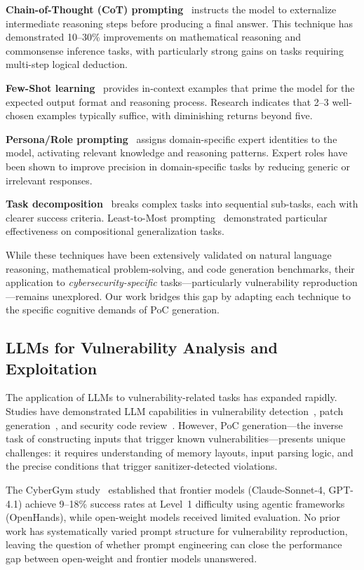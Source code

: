 \documentclass{ieeeaccess}
\begin{document}
\textbf{Chain-of-Thought (CoT) prompting}~\cite{wei2022cot} instructs the model to externalize intermediate reasoning steps before producing a final answer. This technique has demonstrated 10--30\% improvements on mathematical reasoning and commonsense inference tasks, with particularly strong gains on tasks requiring multi-step logical deduction.

\textbf{Few-Shot learning}~\cite{brown2020fewshot} provides in-context examples that prime the model for the expected output format and reasoning process. Research indicates that 2--3 well-chosen examples typically suffice, with diminishing returns beyond five.

\textbf{Persona/Role prompting}~\cite{zheng2023persona} assigns domain-specific expert identities to the model, activating relevant knowledge and reasoning patterns. Expert roles have been shown to improve precision in domain-specific tasks by reducing generic or irrelevant responses.

\textbf{Task decomposition}~\cite{zhou2023leasttomost} breaks complex tasks into sequential sub-tasks, each with clearer success criteria. Least-to-Most prompting~\cite{zhou2023leasttomost} demonstrated particular effectiveness on compositional generalization tasks.

While these techniques have been extensively validated on natural language reasoning, mathematical problem-solving, and code generation benchmarks, their application to \emph{cybersecurity-specific} tasks---particularly vulnerability reproduction---remains unexplored. Our work bridges this gap by adapting each technique to the specific cognitive demands of PoC generation.

\subsection{LLMs for Vulnerability Analysis and Exploitation}

The application of LLMs to vulnerability-related tasks has expanded rapidly. Studies have demonstrated LLM capabilities in vulnerability detection~\cite{li2024vulndetection}, patch generation~\cite{patch_generation}, and security code review~\cite{code_review}. However, PoC generation---the inverse task of constructing inputs that trigger known vulnerabilities---presents unique challenges: it requires understanding of memory layouts, input parsing logic, and the precise conditions that trigger sanitizer-detected violations.

The CyberGym study~\cite{cybergym} established that frontier models (Claude-Sonnet-4, GPT-4.1) achieve 9--18\% success rates at Level~1 difficulty using agentic frameworks (OpenHands), while open-weight models received limited evaluation. No prior work has systematically varied prompt structure for vulnerability reproduction, leaving the question of whether prompt engineering can close the performance gap between open-weight and frontier models unanswered.
\end{document}
